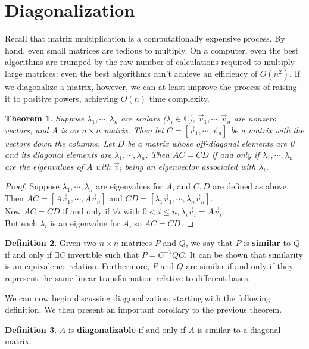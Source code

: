 \documentclass[11pt]{amsart}
\newtheorem{theorem}{Theorem}[section]
\theoremstyle{definition}
\newtheorem{definition}[theorem]{Definition}
\newcommand{\complexNumbers}{\mathbb{C}}
\begin{document}
\section{Diagonalization}
Recall that matrix multiplication is a computationally expensive process. By hand, even small matrices are tedious to multiply. On a computer,
even the best algorithms are trumped by the raw number of calculations required to multiply large matrices: even the best algorithms can't
achieve an efficiency of $O(n^2)$. If we diagonalize a matrix, however, we can at least improve the process of raising it to positive powers,
achieving $O(n)$ time complexity.
\begin{theorem}
	Suppose $\lambda_1, \cdots, \lambda_n$ are scalars ($\lambda_i \in \complexNumbers$), $\vec{v}_1, \cdots, \vec{v}_n$ are
	nonzero vectors, and $A$ is an $n \times n$ matrix. Then let $C = [ \vec{v}_1, \cdots, \vec{v}_n ]$ be a matrix with the vectors down the
	columns. Let $D$ be a matrix whose off-diagonal elements are 0 and its diagonal elements are $\lambda_1, \cdots, \lambda_n$.
	Then $AC = CD$ if and only if $\lambda_1, \cdots, \lambda_n$ are the eigenvalues of $A$ with $\vec{v}_i$ being an eigenvector
	associated with $\lambda_i$.
\end{theorem}
\begin{proof}
	Suppose $\lambda_1, \cdots, \lambda_n$ are eigenvalues for $A$, and $C, D$ are defined as above. \\
	Then $AC = [ A\vec{v}_1, \cdots, A\vec{v}_n ]$ and $CD = [ \lambda_1 \vec{v}_1, \cdots, \lambda_n \vec{v}_n ]$. \\
	Now $AC = CD$ if and only if $\forall i$ with $0 < i \leq n, \lambda_i \vec{v}_i = A\vec{v}_i$. \\
	But each $\lambda_i$ is an eigenvalue for $A$, so $AC = CD$.
\end{proof}
\begin{definition}
	Given two $n \times n$ matrices $P$ and $Q$, we say that $P$ is \textbf{similar} to $Q$ if and only if $\exists C$ invertible such that
	$P = C^{-1}QC$. It can be shown that similarity is an equivalence relation. Furthermore, $P$ and $Q$ are similar if and only if they
	represent the same linear transformation relative to different bases.
\end{definition}
We can now begin discussing diagonalization, starting with the following definition. We then present an important corollary to the previous
theorem.
\begin{definition}
	$A$ is \textbf{diagonalizable} if and only if $A$ is similar to a diagonal matrix.
\end{definition}
\end{document}
